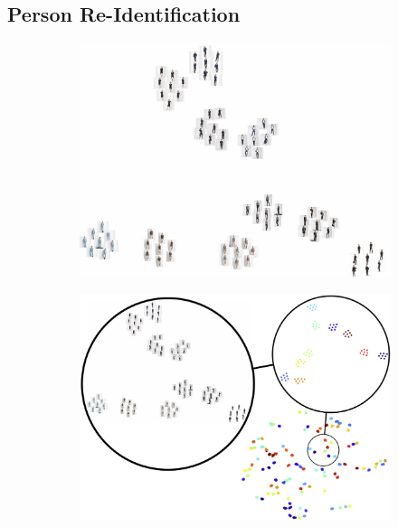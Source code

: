 	\subsection{Person Re-Identification}

	\begin{figure}[htp]
		\centering
		\begin{subfigure}{0.49\linewidth}
		\includegraphics[trim={0cm 0cm 0cm 0cm},clip, width=1.0\linewidth]{fig/factor/tsne_img}
		\end{subfigure}
		\begin{subfigure}{0.49\linewidth}
		\includegraphics[trim={0cm 0cm 0cm 0cm},clip, width=1.0\linewidth]{fig/factor/tsne_bubble}

\end{subfigure}
\end{figure}
